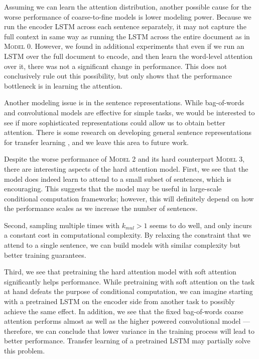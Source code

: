 \documentclass[12pt]{report}
\begin{document}
Assuming we can learn the attention distribution, another possible cause for the worse performance of coarse-to-fine models is lower modeling power. Because we run the encoder LSTM across each sentence separately, it may not capture the full context in same way as running the LSTM across the entire document as in \textsc{Model 0}.
However, we found in additional experiments that even if we run an LSTM over the full document to encode, and then learn the word-level attention over it, there was not a significant change in performance. This does not conclusively rule out this possibility, but only shows that the performance bottleneck is in learning the attention.

Another modeling issue is in the sentence representations. While bag-of-words and convolutional models are effective for simple tasks, we would be interested to see if more sophisticated representations could allow us to obtain better attention. There is some research on developing general sentence representations for transfer learning \citep{Bowman2015}, and we leave this area to future work.


Despite the worse performance of \textsc{Model 2} and its hard counterpart \textsc{Model 3}, there are interesting aspects of the hard attention model. First, we see that the model does indeed learn to attend to a small subset of sentences, which is encouraging. This suggests that the model may be useful in large-scale conditional computation frameworks; however, this will definitely depend on how the performance scales as we increase the number of sentences.

Second, sampling multiple times with $k_{mul} > 1$ seems to do well, and only incurs a constant cost in computational complexity. By relaxing the constraint that we attend to a single sentence, we can build models with similar complexity but better training guarantees. 


Third, we see that pretraining the hard attention model with soft attention significantly helps performance. While pretraining with soft attention on the task at hand defeats the purpose of conditional computation, we can imagine starting with a pretrained LSTM on the encoder side from another task to possibly achieve the same effect.
In addition, we see that the fixed bag-of-words coarse attention performs almost as well as the higher powered convolutional model --- therefore, we can conclude that lower variance in the training process will lead to better performance. Transfer learning of a pretrained LSTM may partially solve this problem.
\end{document}
